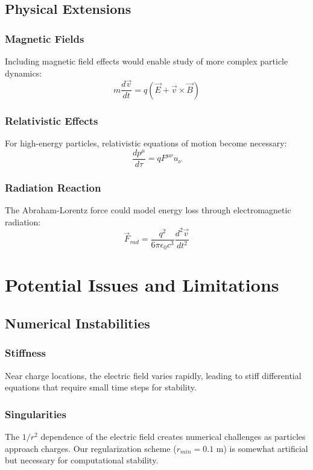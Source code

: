 \documentclass[12pt,a4paper]{article}
\begin{document}
\subsection{Physical Extensions} 

\subsubsection{Magnetic Fields} 
Including magnetic field effects would enable study of more complex particle dynamics: 
\begin{equation} 
    m\frac{d\vec{v}}{dt} = q(\vec{E} + \vec{v} \times \vec{B}) 
\end{equation} 

\subsubsection{Relativistic Effects} 
For high-energy particles, relativistic equations of motion become necessary: 
\begin{equation} 
    \frac{dp^\mu}{d\tau} = qF^{\mu\nu}u_\nu 
\end{equation} 

\subsubsection{Radiation Reaction} 
The Abraham-Lorentz force could model energy loss through electromagnetic radiation: 
\begin{equation} 
    \vec{F}_{rad} = \frac{q^2}{6\pi\epsilon_0 c^3} \frac{d^2\vec{v}}{dt^2} 
\end{equation} 

\section{Potential Issues and Limitations} 
\subsection{Numerical Instabilities} 

\subsubsection{Stiffness} 
Near charge locations, the electric field varies rapidly, leading to stiff differential equations that require small time steps for stability. 

\subsubsection{Singularities} 
The $1/r^2$ dependence of the electric field creates numerical challenges as particles approach charges. Our regularization scheme ($r_{min} = 0.1$ m) is somewhat artificial but necessary for computational stability. 
\end{document}
